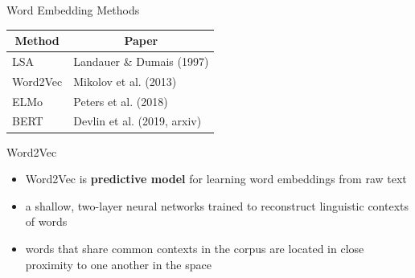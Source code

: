 \documentclass[professionalfonts, xcolor={usenames,svgnames,x11names,table}]{beamer}
\begin{document}
\begin{frame}{Word Embedding Methods}
\centering 

\begin{table}[]
\begin{tabular}{ll}
\hline
\multicolumn{1}{c}{Method} & \multicolumn{1}{c}{Paper}   \\ \hline  \hline
LSA                        & Landauer \& Dumais (1997)   \\
Word2Vec                   & Mikolov et al.  (2013)      \\
ELMo                       & Peters et al.  (2018)       \\
BERT                       & Devlin et al. (2019, arxiv) \\ \hline
\end{tabular}
\end{table}

\pause
\begin{alertblock}{Word2Vec}
\begin{itemize}
	\item Word2Vec is  \textbf{predictive model} for learning word embeddings from raw text
	\item  a shallow, two-layer neural networks trained to reconstruct linguistic contexts of words
	\item words that share common contexts in the corpus are located in close proximity to one another in the space
\end{itemize}
\end{alertblock}

\end{frame}

%
%
%
\end{document}

